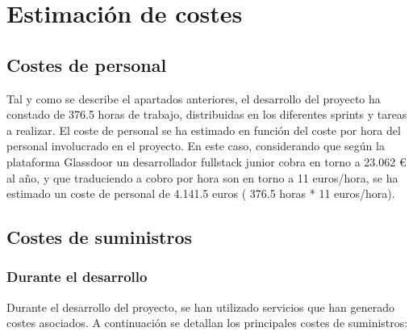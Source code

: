 \section{Estimación de costes}

\subsection{Costes de personal}

Tal y como se describe el apartados anteriores, el desarrollo del proyecto ha constado de 376.5 horas de trabajo, distribuidas en los diferentes sprints y tareas a realizar.
\newline\newline
El coste de personal se ha estimado en función del coste por hora del personal involucrado en el proyecto. En este caso, considerando que según la plataforma Glassdoor \cite{webGlassdoor} un desarrollador fullstack junior cobra en torno a 23.062 € al año, y que traduciendo a cobro por hora son en torno a 11 euros/hora, se ha estimado un coste de personal de 4.141.5 euros ( 376.5 horas * 11 euros/hora).

\subsection{Costes de suministros}

\subsubsection{Durante el desarrollo}

Durante el desarrollo del proyecto, se han utilizado servicios que han generado costes asociados. A continuación se detallan los principales costes de suministros:





